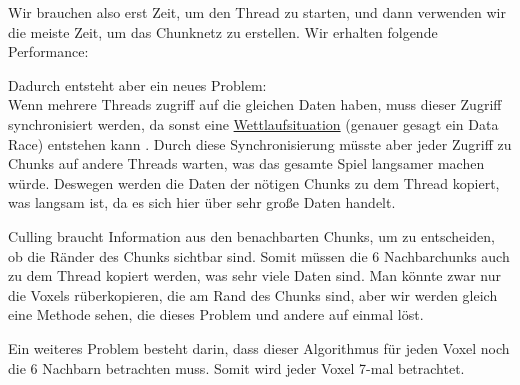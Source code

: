 Wir brauchen also erst Zeit, um den Thread zu starten,
und dann verwenden wir die meiste Zeit, um das
Chunknetz zu erstellen.
Wir erhalten folgende Performance:

\vspace{0.3cm}


\vspace{0.3cm}

Dadurch entsteht aber ein neues Problem: \\
Wenn mehrere Threads zugriff auf die gleichen Daten
haben, muss dieser Zugriff synchronisiert werden,
da sonst eine
\href{https://de.wikipedia.org/wiki/Wettlaufsituation}{Wettlaufsituation}
\cite{wiki_wettlauf} (genauer gesagt ein Data Race)
entstehen kann \cite{nomicon_races}.
Durch diese Synchronisierung müsste aber jeder Zugriff
zu Chunks auf andere Threads warten, was das gesamte
Spiel langsamer machen würde. Deswegen werden die
Daten der nötigen Chunks zu dem Thread kopiert,
was langsam ist, da es sich hier über sehr große Daten
handelt.

Culling braucht Information aus den benachbarten
Chunks, um zu entscheiden, ob die Ränder des Chunks
sichtbar sind. Somit müssen die 6 Nachbarchunks
auch zu dem Thread kopiert werden, was sehr viele
Daten sind. Man könnte zwar nur die Voxels
rüberkopieren, die am Rand des Chunks sind,
aber wir werden gleich eine Methode sehen,
die dieses Problem und andere auf einmal löst.

\vspace{0.3cm}

Ein weiteres Problem besteht darin, dass dieser
Algorithmus für jeden Voxel noch die 6 Nachbarn
betrachten muss. Somit wird jeder Voxel 7-mal
betrachtet.
